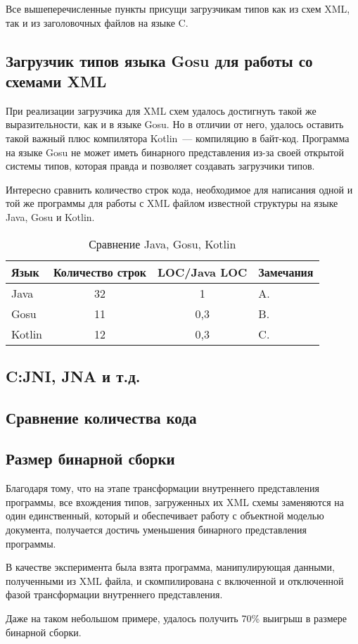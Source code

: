 Все вышеперечисленные пункты присущи загрузчикам типов как из схем XML, так и из заголовочных файлов на языке C.

\subsection{Загрузчик типов языка Gosu для работы со схемами XML}
При реализации загрузчика для XML схем удалось достигнуть такой же выразительности, как и в языке Gosu.
Но в отличии от него, удалось оставить такой важный плюс компилятора Kotlin~--- компиляцию в байт-код.
Программа на языке Gosu не может иметь бинарного представления из-за своей открытой системы типов,
которая правда и позволяет создавать загрузчики типов.

Интересно сравнить количество строк кода, необходимое для написания одной и той же программы для работы с XML файлом известной структуры на языке Java, Gosu и Kotlin.

\begin{table}\begin{center}
\begin{center}
    \begin{tabular}{ | l | c | c | p{5cm} |}
    \hline
    Язык & Количество строк & LOC/Java LOC & Замечания \\ \hline
    Java & 32 & 1 & A. \\ \hline
    Gosu & 11 & 0,3 & B. \\ \hline
    Kotlin & 12 & 0,3 & C. \\
    \hline
    \end{tabular}
\end{center}
\caption{Сравнение Java, Gosu, Kotlin}
\label{tab:comparation_java_gosu_kotlin}
\end{center}
\end{table}

\subsection{C:\@ JNI, JNA и т.д.}
\subsection{Сравнение количества кода}
\subsection{Размер бинарной сборки}
Благодаря тому, что на этапе трансформации внутреннего представления программы, все вхождения типов, загруженных их XML схемы заменяются на один единственный, который и обеспечивает работу с объектной моделью документа, получается достичь уменьшения бинарного представления программы.

В качестве эксперимента была взята программа, манипулирующая данными, полученными из XML файла, и скомпилирована с включенной и отключенной фазой трансформации внутреннего представления.

Даже на таком небольшом примере, удалось получить 70\% выигрыш в размере бинарной сборки.